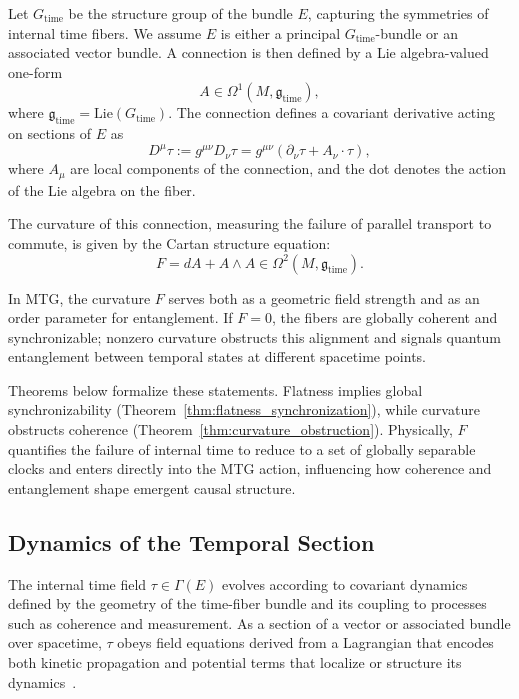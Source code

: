\documentclass[11pt]{article}
\begin{document}
Let \( G_{\text{time}} \) be the structure group of the bundle \( E \), capturing the symmetries of internal time fibers. We assume \( E \) is either a principal \( G_{\text{time}} \)-bundle or an associated vector bundle. A connection is then defined by a Lie algebra-valued one-form
\begin{equation}
A \in \Omega^1(M, \mathfrak{g}_{\text{time}}),
\end{equation}
where \( \mathfrak{g}_{\text{time}} = \text{Lie}(G_{\text{time}}) \). The connection defines a covariant derivative acting on sections of \( E \) as
\begin{equation}
D^\mu \tau := g^{\mu\nu} D_\nu \tau = g^{\mu\nu}(\partial_\nu \tau + A_\nu \cdot \tau),
\end{equation}
where \( A_\mu \) are local components of the connection, and the dot denotes the action of the Lie algebra on the fiber.

The curvature of this connection, measuring the failure of parallel transport to commute, is given by the Cartan structure equation:
\begin{equation}
F = dA + A \wedge A \in \Omega^2(M, \mathfrak{g}_{\text{time}}).
\end{equation}

In MTG, the curvature \( F \) serves both as a geometric field strength and as an order parameter for entanglement. If \( F = 0 \), the fibers are globally coherent and synchronizable; nonzero curvature obstructs this alignment and signals quantum entanglement between temporal states at different spacetime points.

Theorems below formalize these statements. Flatness implies global synchronizability (Theorem~\ref{thm:flatness_synchronization}), while curvature obstructs coherence (Theorem~\ref{thm:curvature_obstruction}). Physically, \( F \) quantifies the failure of internal time to reduce to a set of globally separable clocks and enters directly into the MTG action, influencing how coherence and entanglement shape emergent causal structure.

\subsection{Dynamics of the Temporal Section}\label{sec:2.2}

The internal time field \( \tau \in \Gamma(E) \) evolves according to covariant dynamics defined by the geometry of the time-fiber bundle and its coupling to processes such as coherence and measurement. As a section of a vector or associated bundle over spacetime, \( \tau \) obeys field equations derived from a Lagrangian that encodes both kinetic propagation and potential terms that localize or structure its dynamics~\cite{kiefer2007time}.
\end{document}
